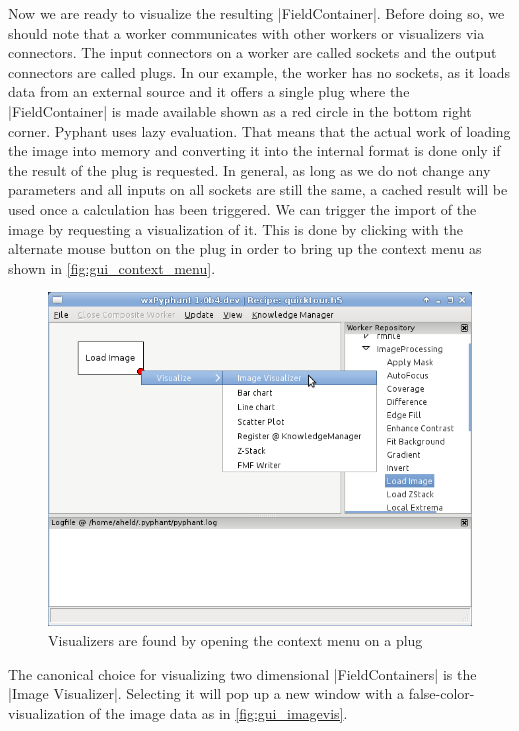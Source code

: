 \documentclass[a4paper]{article}
\begin{document}
Now we are ready to visualize the resulting |FieldContainer|. Before
doing so, we should note that a worker communicates with other workers
or visualizers via connectors. The input connectors on a worker are
called sockets and the output connectors are called plugs. In our
example, the worker has no sockets, as it loads data from an
external source and it offers a single plug where the
|FieldContainer| is made available shown as a red circle in the bottom
right corner. Pyphant uses lazy evaluation. That means that the actual
work of loading the image into memory and converting it into the
internal format is done only if the result of the plug is
requested. In general, as long as we do not change any parameters and
all inputs on all sockets are still the same, a cached result will
be used once a calculation has been triggered. We can trigger the
import of the image by requesting a visualization of it. This is done
by clicking with the alternate mouse button on the plug in order to
bring up the context menu as shown in \autoref{fig:gui_context_menu}.
\begin{figure}[h]
  \centering
  \includegraphics[scale=0.75]{fig/gui_context_menu.png}
  \caption{Visualizers are found by opening the context menu on a plug}
  \label{fig:gui_context_menu}
\end{figure}
The canonical choice for visualizing two dimensional |FieldContainers|
is the |Image Visualizer|. Selecting it will pop up a new window with
a false-color-visualization of the image data as in
\autoref{fig:gui_imagevis}.
\end{document}
